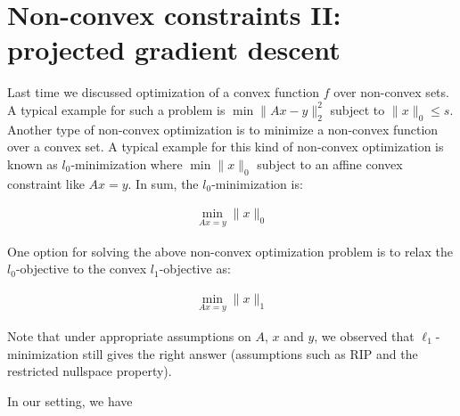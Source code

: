 \section{Non-convex constraints II: projected gradient descent} 


Last time we discussed optimization of a convex function $f$ over non-convex sets. A typical example for such a problem is $\min \| Ax-y\|_2^2$ subject to $\|x\|_0 \leq s$. Another type of non-convex optimization is to minimize a non-convex function over a convex set. A typical example for this kind of non-convex optimization is known as $l_0$-minimization where $\min \| x\|_0$ subject to an affine convex constraint like $Ax=y$. In sum, the $l_0$-minimization is: 

\begin{align*}
\min_{Ax=y} \|x\|_0
\end{align*}

One option for solving the above non-convex optimization problem is to relax the $l_0$-objective to the convex $l_1$-objective as:

\begin{align*}
\min_{Ax=y} \|x\|_1
\end{align*}





Note that under appropriate assumptions on $A$, $x$ and $y$, we observed that $\ell_1$-minimization still gives the right answer (assumptions such as RIP and the restricted nullspace property).




In our setting, we have \\

